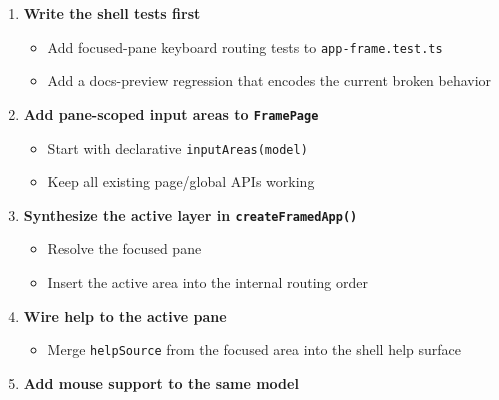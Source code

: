 \begin{enumerate}
\def\labelenumi{\arabic{enumi}.}
\tightlist
\item
  \textbf{Write the shell tests first}

  \begin{itemize}
  \tightlist
  \item
    Add focused-pane keyboard routing tests to \texttt{a\allowbreak{}p\allowbreak{}p\allowbreak{}-\allowbreak{}f\allowbreak{}r\allowbreak{}a\allowbreak{}m\allowbreak{}e\allowbreak{}.\allowbreak{}t\allowbreak{}e\allowbreak{}s\allowbreak{}t\allowbreak{}.\allowbreak{}t\allowbreak{}s}
  \item
    Add a docs-preview regression that encodes the current broken behavior
  \end{itemize}
\item
  \textbf{Add pane-scoped input areas to \texttt{F\allowbreak{}r\allowbreak{}a\allowbreak{}m\allowbreak{}e\allowbreak{}P\allowbreak{}a\allowbreak{}g\allowbreak{}e}}

  \begin{itemize}
  \tightlist
  \item
    Start with declarative \texttt{i\allowbreak{}n\allowbreak{}p\allowbreak{}u\allowbreak{}t\allowbreak{}A\allowbreak{}r\allowbreak{}e\allowbreak{}a\allowbreak{}s\allowbreak{}(\allowbreak{}m\allowbreak{}o\allowbreak{}d\allowbreak{}e\allowbreak{}l\allowbreak{})}
  \item
    Keep all existing page/global APIs working
  \end{itemize}
\item
  \textbf{Synthesize the active layer in \texttt{c\allowbreak{}r\allowbreak{}e\allowbreak{}a\allowbreak{}t\allowbreak{}e\allowbreak{}F\allowbreak{}r\allowbreak{}a\allowbreak{}m\allowbreak{}e\allowbreak{}d\allowbreak{}A\allowbreak{}p\allowbreak{}p\allowbreak{}(\allowbreak{})}}

  \begin{itemize}
  \tightlist
  \item
    Resolve the focused pane
  \item
    Insert the active area into the internal routing order
  \end{itemize}
\item
  \textbf{Wire help to the active pane}

  \begin{itemize}
  \tightlist
  \item
    Merge \texttt{h\allowbreak{}e\allowbreak{}l\allowbreak{}p\allowbreak{}S\allowbreak{}o\allowbreak{}u\allowbreak{}r\allowbreak{}c\allowbreak{}e} from the focused area into the shell help surface
  \end{itemize}
\item
  \textbf{Add mouse support to the same model}


\end{enumerate}
